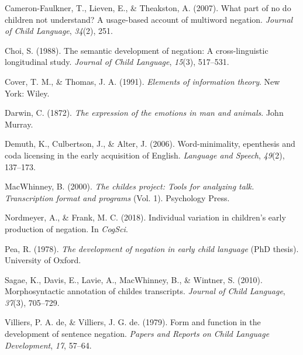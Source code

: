 \documentclass[10pt, letterpaper]{article}
\begin{document}
\leavevmode\hypertarget{ref-cameron2007part}{}%
Cameron-Faulkner, T., Lieven, E., \& Theakston, A. (2007). What part of
no do children not understand? A usage-based account of multiword
negation. \emph{Journal of Child Language}, \emph{34}(2), 251.

\leavevmode\hypertarget{ref-choi1988semantic}{}%
Choi, S. (1988). The semantic development of negation: A
cross-linguistic longitudinal study. \emph{Journal of Child Language},
\emph{15}(3), 517--531.

\leavevmode\hypertarget{ref-cover_elements_1991}{}%
Cover, T. M., \& Thomas, J. A. (1991). \emph{Elements of information
theory}. New York: Wiley.

\leavevmode\hypertarget{ref-darwin1872expression}{}%
Darwin, C. (1872). \emph{The expression of the emotions in man and
animals}. John Murray.

\leavevmode\hypertarget{ref-demuth2006word}{}%
Demuth, K., Culbertson, J., \& Alter, J. (2006). Word-minimality,
epenthesis and coda licensing in the early acquisition of English.
\emph{Language and Speech}, \emph{49}(2), 137--173.

\leavevmode\hypertarget{ref-macwhinney2000childes}{}%
MacWhinney, B. (2000). \emph{The childes project: Tools for analyzing
talk. Transcription format and programs} (Vol. 1). Psychology Press.

\leavevmode\hypertarget{ref-nordmeyer2018individual}{}%
Nordmeyer, A., \& Frank, M. C. (2018). Individual variation in
children's early production of negation. In \emph{CogSci}.

\leavevmode\hypertarget{ref-pea1978}{}%
Pea, R. (1978). \emph{The development of negation in early child
language} (PhD thesis). University of Oxford.

\leavevmode\hypertarget{ref-sagae2010morphosyntactic}{}%
Sagae, K., Davis, E., Lavie, A., MacWhinney, B., \& Wintner, S. (2010).
Morphosyntactic annotation of childes transcripts. \emph{Journal of
Child Language}, \emph{37}(3), 705--729.

\leavevmode\hypertarget{ref-de1979form}{}%
Villiers, P. A. de, \& Villiers, J. G. de. (1979). Form and function in
the development of sentence negation. \emph{Papers and Reports on Child
Language Development}, \emph{17}, 57--64.


\end{document}
